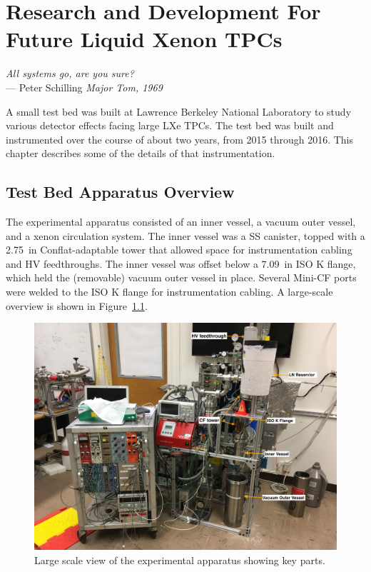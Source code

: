 \chapter{Research and Development For Future Liquid Xenon TPCs}

\label{ch:testbed} %

\begin{flushright}{\slshape    
  All systems go, are you sure? } \\ \medskip
    --- {Peter Schilling \textit{Major Tom, 1969}}
\end{flushright}


A small test bed was built at Lawrence Berkeley National Laboratory to study various detector effects facing large \ac{LXe} \ac{TPC}s. The test bed was built and instrumented over the course of about two years, from 2015 through 2016. This chapter describes some of the details of that instrumentation.

\section{Test Bed Apparatus Overview}
The experimental apparatus consisted of an inner vessel, a vacuum outer vessel, and a xenon circulation system. The inner vessel was a \ac{SS} canister, topped with a 2.75~in Conflat-adaptable tower that allowed space for instrumentation cabling and \ac{HV} feedthroughs. The inner vessel was offset below a 7.09~in ISO K flange, which held the (removable) vacuum outer vessel in place. Several Mini-CF ports were welded to the ISO K flange for instrumentation cabling. A large-scale overview is shown in Figure~\ref{fig:apparatus}.

\begin{figure}[htbp]
\begin{center}
\includegraphics[width=\textwidth]{figures/testbed/apparatus.jpg}
\caption{Large scale view of the experimental apparatus showing key parts.}
\label{fig:apparatus}
\end{center}
\end{figure}

